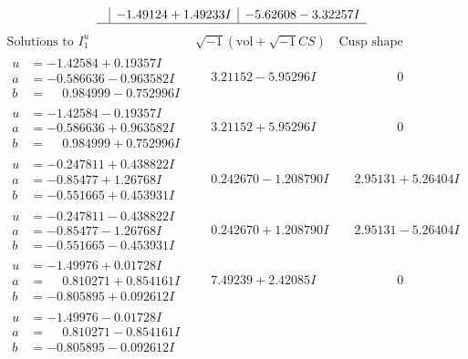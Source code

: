 \documentclass[1p]{elsarticle_modified}
\theoremstyle{definition}
\newcommand{\I}{\sqrt{-1}}
\begin{document}
$$\begin{array}{c|c|c}
 & -1.49124 + 1.49233 I & -5.62608 - 3.32257 I\\
 \hline 
 \end{array}$$\newpage$$\begin{array}{c|c|c}  
\text{Solutions to }I^u_{1}& \I (\text{vol} + \sqrt{-1}CS) & \text{Cusp shape}\\
 \hline 
\begin{aligned}
u &= -1.42584 + 0.19357 I \\
a &= -0.586636 - 0.963582 I \\
b &= \phantom{-}0.984999 - 0.752996 I\end{aligned}
 & \phantom{-}3.21152 - 5.95296 I & \phantom{-0.000000 } 0 \\ \hline\begin{aligned}
u &= -1.42584 - 0.19357 I \\
a &= -0.586636 + 0.963582 I \\
b &= \phantom{-}0.984999 + 0.752996 I\end{aligned}
 & \phantom{-}3.21152 + 5.95296 I & \phantom{-0.000000 } 0 \\ \hline\begin{aligned}
u &= -0.247811 + 0.438822 I \\
a &= -0.85477 + 1.26768 I \\
b &= -0.551665 + 0.453931 I\end{aligned}
 & \phantom{-}0.242670 - 1.208790 I & \phantom{-}2.95131 + 5.26404 I \\ \hline\begin{aligned}
u &= -0.247811 - 0.438822 I \\
a &= -0.85477 - 1.26768 I \\
b &= -0.551665 - 0.453931 I\end{aligned}
 & \phantom{-}0.242670 + 1.208790 I & \phantom{-}2.95131 - 5.26404 I \\ \hline\begin{aligned}
u &= -1.49976 + 0.01728 I \\
a &= \phantom{-}0.810271 + 0.854161 I \\
b &= -0.805895 + 0.092612 I\end{aligned}
 & \phantom{-}7.49239 + 2.42085 I & \phantom{-0.000000 } 0 \\ \hline\begin{aligned}
u &= -1.49976 - 0.01728 I \\
a &= \phantom{-}0.810271 - 0.854161 I \\
b &= -0.805895 - 0.092612 I\end{aligned}

\end{array}$$
\end{document}
